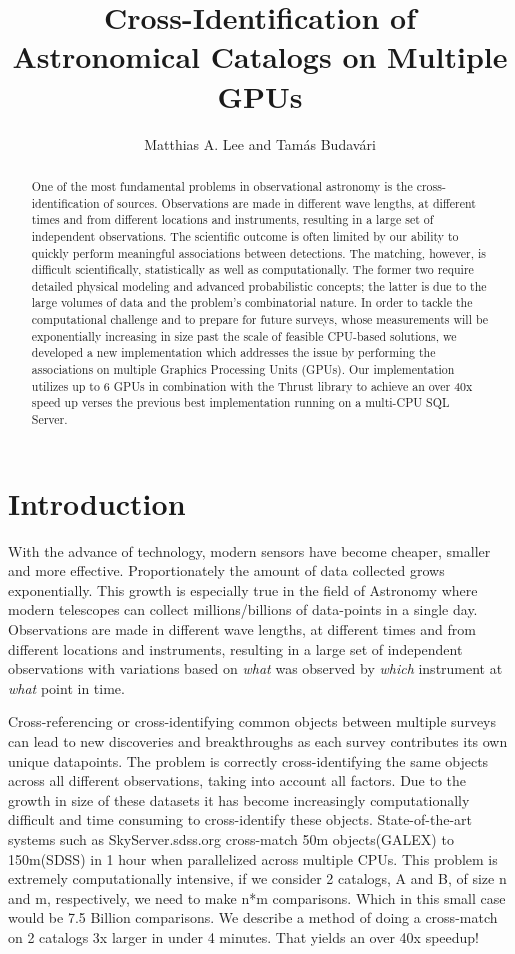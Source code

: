 \documentclass[11pt,twoside]{article}
\begin{document}
\title{Cross-Identification of Astronomical Catalogs on Multiple GPUs}
\author{Matthias A. Lee and Tam\'as Budav\'ari
}


\begin{abstract}
One of the most fundamental problems in observational astronomy is the cross-identification of sources. Observations are made in different wave lengths, at different times and from different locations and instruments, resulting in a large set of independent observations. The scientific outcome is often limited by our ability to quickly perform meaningful associations between detections. The matching, however, is difficult scientifically, statistically as well as computationally. The former two require detailed physical modeling and advanced probabilistic concepts; the latter is due to the large volumes of data and the problem's combinatorial nature. In order to tackle the computational challenge and to prepare for future surveys, whose measurements will be exponentially increasing in size past the scale of feasible CPU-based solutions, we developed a new implementation which addresses the issue by performing the associations on multiple Graphics Processing Units (GPUs). Our implementation utilizes up to 6 GPUs in combination with the Thrust library to achieve an over 40x speed up verses the previous best implementation running on a multi-CPU SQL Server.
\end{abstract}


\section{Introduction}
With the advance of technology, modern sensors have become cheaper, smaller and more effective. Proportionately the amount of data collected grows exponentially. This growth is especially true in the field of Astronomy where modern telescopes can collect millions/billions of data-points in a single day. Observations are made in different wave lengths, at different times and from different locations and instruments, resulting in a large set of independent observations with variations based on \textit{what} was observed by \textit{which} instrument at \textit{what} point in time.

Cross-referencing or cross-identifying common objects between multiple surveys can lead to new discoveries and breakthroughs as each survey contributes its own unique datapoints. The problem is correctly cross-identifying the same objects across all different observations, taking into account all factors. Due to the growth in size of these datasets it has become increasingly computationally difficult and time consuming to cross-identify these objects. State-of-the-art systems such as SkyServer.sdss.org cross-match 50m objects(GALEX) to 150m(SDSS) in 1 hour when parallelized across multiple CPUs. This problem is extremely computationally intensive, if we consider 2 catalogs, A and B, of size n and m, respectively, we need to make n*m comparisons. Which in this small case would be 7.5 Billion comparisons. We describe a method of doing a cross-match on 2 catalogs 3x larger in under 4 minutes. That yields an over 40x speedup!
\end{document}
